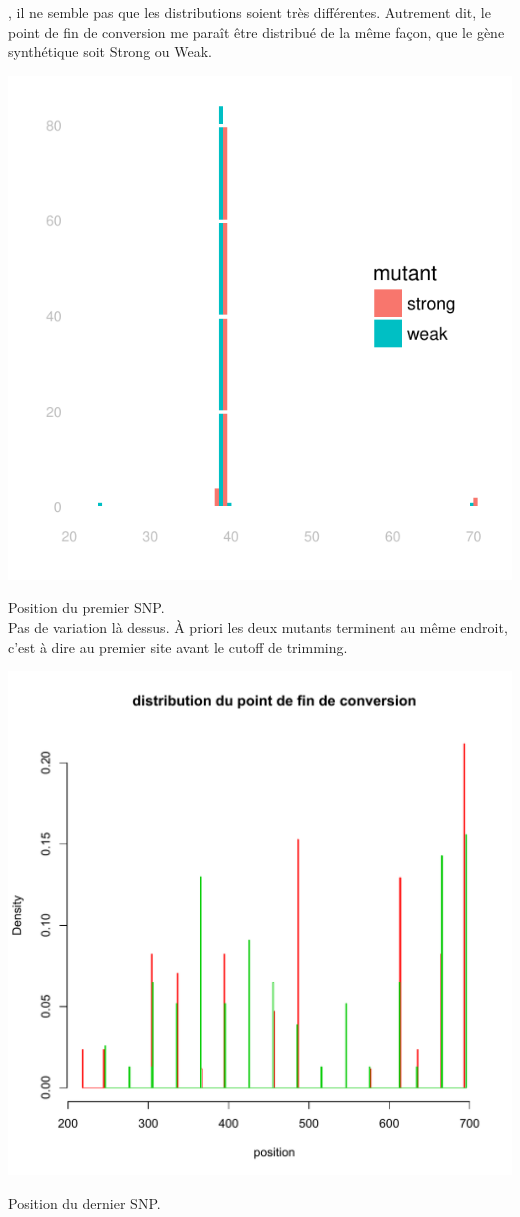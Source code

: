 \documentclass[a4paper]{tufte-handout}
\begin{document}
, il ne semble pas que les distributions soient très
différentes. Autrement dit, le point de fin de conversion me paraît être
distribué de la même façon, que le gène synthétique soit Strong ou Weak.
\newpage
\begin{marginfigure}
  \includegraphics[width=\linewidth]{../end_switch.pdf}
  \caption{Position du premier SNP.\\
    Pas de variation là dessus. À priori les deux mutants terminent au même
    endroit, c'est à dire au premier site avant le cutoff de trimming. 
  }
\end{marginfigure}


\begin{marginfigure}
  \includegraphics[width=\linewidth]{../vincent_plot.pdf}
  \caption{Position du dernier SNP. 
  }
  \label{figvincent}
\end{marginfigure}
\end{document}
